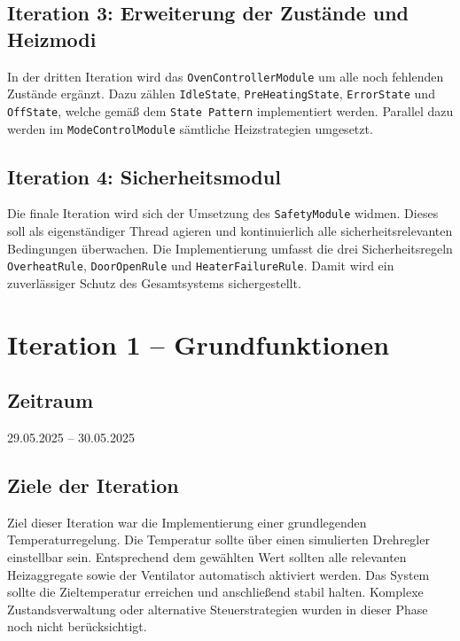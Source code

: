 \documentclass[a4paper,12pt]{article}
\begin{document}
\subsection*{Iteration 3: Erweiterung der Zustände und Heizmodi}

In der dritten Iteration wird das \texttt{OvenControllerModule} um alle noch fehlenden Zustände ergänzt. Dazu zählen \texttt{IdleState}, \texttt{PreHeatingState}, \texttt{ErrorState} und \texttt{OffState}, welche gemäß dem \texttt{State Pattern} implementiert werden. Parallel dazu werden im \texttt{ModeControlModule} sämtliche Heizstrategien umgesetzt.

\subsection*{Iteration 4: Sicherheitsmodul}

Die finale Iteration wird sich der Umsetzung des \texttt{SafetyModule} widmen. Dieses soll als eigenständiger Thread agieren und kontinuierlich alle sicherheitsrelevanten Bedingungen überwachen. Die Implementierung umfasst die drei Sicherheitsregeln \texttt{OverheatRule}, \texttt{DoorOpenRule} und \texttt{HeaterFailureRule}. Damit wird ein zuverlässiger Schutz des Gesamtsystems sichergestellt.

\newpage

\section{Iteration 1 – Grundfunktionen}
\label{sec:iteration1}

\subsection{Zeitraum}
29.05.2025 – 30.05.2025

\subsection{Ziele der Iteration}
Ziel dieser Iteration war die Implementierung einer grundlegenden Temperaturregelung. Die Temperatur sollte über einen simulierten Drehregler einstellbar sein. Entsprechend dem gewählten Wert sollten alle relevanten Heizaggregate sowie der Ventilator automatisch aktiviert werden. Das System sollte die Zieltemperatur erreichen und anschließend stabil halten. Komplexe Zustandsverwaltung oder alternative Steuerstrategien wurden in dieser Phase noch nicht berücksichtigt.
\end{document}
